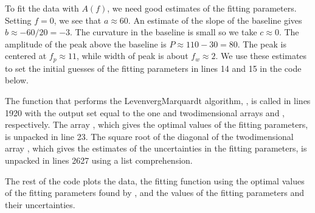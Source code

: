 \documentclass[letterpaper,10pt,english]{sphinxmanual}
\begin{document}
\sphinxAtStartPar
To fit the data with \(A(f)\), we need good estimates of the fitting parameters.  Setting \(f=0\), we see that \(a \approx 60\).  An estimate of the slope of the baseline gives \(b \approx -60/20=-3\).  The curvature in the baseline is small so we take \(c \approx 0\).  The amplitude of the peak above the baseline is \(P \approx 110-30=80\).  The peak is centered at \(f_p \approx 11\), while width of peak is about \(f_w \approx 2\).  We use these estimates to set the initial guesses of the fitting parameters in lines 14 and 15 in the code below.

\ignorespaces 
\sphinxAtStartPar
The function that performs the Levenverg\sphinxhyphen{}Marquardt algorithm, , is called in lines 19\sphinxhyphen{}20 with the output set equal to the one and two\sphinxhyphen{}dimensional arrays  and , respectively.  The array , which gives the optimal values of the  fitting parameters, is unpacked in line 23.  The square root of the diagonal of the two\sphinxhyphen{}dimensional array , which gives the estimates of the uncertainties in the fitting parameters, is unpacked in lines 26\sphinxhyphen{}27 using a list comprehension.

\sphinxAtStartPar
The rest of the code plots the data, the fitting function using the optimal values of the fitting parameters found by , and the values of the fitting parameters and their uncertainties.
\end{document}
